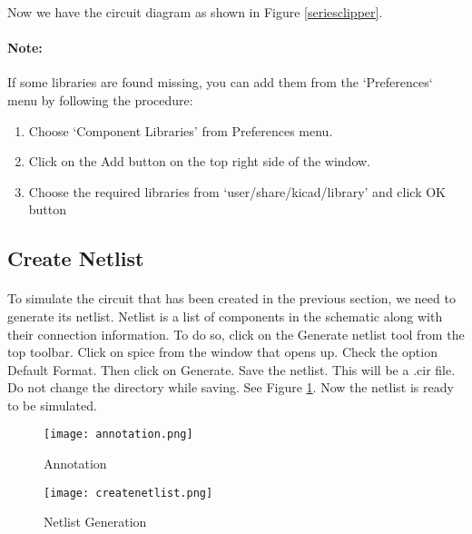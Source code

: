 Now we have the circuit diagram as shown in Figure \ref{seriesclipper}.


\paragraph{Note:} If some libraries are found missing, you can add them from the `Preferences` menu by following the procedure: 

\begin{enumerate}
\item
Choose `Component Libraries' from Preferences menu.

\item
Click on the Add button on the top right side of the window.

\item
Choose the required libraries from `user/share/kicad/library' and click OK button

\end{enumerate}

\subsection*{Create Netlist}

\paragraph{}To simulate the circuit that has been created in the previous section, we need to generate
its netlist. Netlist is a list of components in the schematic along with their connection
information. To do so, click on the Generate netlist tool from the top toolbar. Click on
spice from the window that opens up. Check the option Default Format. Then click
on Generate. Save the netlist. This will be a .cir file. Do
not change the directory while saving. See Figure \ref{createnetlistclip}.
 Now the netlist is ready to be simulated. 
\begin{figure}
\begin{minipage}{.5\textwidth}
  \centering
  \texttt{[image: annotation.png]}
  \caption{Annotation}
  \label{annotationclip}
\end{minipage}%
\begin{minipage}{.5\textwidth}
  \centering
  \texttt{[image: createnetlist.png]}
  \caption{Netlist Generation}
  \label{createnetlistclip}
\end{minipage}
\end{figure}

